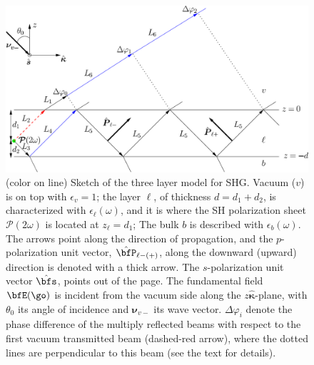 \documentclass[aps,11pt]{revtex4}
\begin{document}
\begin{figure}[t]
\centering
\includegraphics[scale=.5]{figures/multi}
\caption{(color on line)
Sketch of the three layer model for SHG. Vacuum ($v$) is on top with
$\epsilon_v=1$; the layer $\ell$, of thickness $d=d_1+d_2$,
 is characterized with
$\epsilon_{\ell}(\omega)$, and it is
 where the SH polarization sheet
$\boldsymbol{\mathcal{P}}(2\omega)$  
is located at $z_\ell=d_1$;
 The bulk $b$ is described with
$\epsilon_{b}(\omega)$. 
The arrows point along the direction of propagation, and the 
$p$-polarization  
unit vector, $\hat\bfP_{\ell -(+)}$, along the downward (upward) direction 
is denoted with a thick arrow.
The $s$-polarization unit vector $\hat\bfs$,  
points out of the page. The fundamental field $\bfE(\go)$ is incident
from the vacuum side
along
the $z\hat{\boldsymbol{\kappa}}$-plane, with
$\theta_0$ its angle of incidence and 
$\boldsymbol{\nu}_{v-}$ its wave vector.
$\Delta\varphi_i$ denote the phase difference of the multiply
reflected beams with respect to the first vacuum transmitted beam 
(dashed-red arrow), where the dotted lines are perpendicular to this 
beam (see the text for details). 
}
\label{3layer}
\end{figure}
\end{document}
